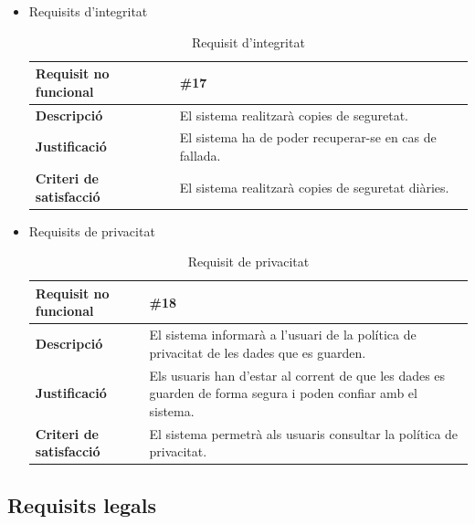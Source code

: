 \begin{itemize}
\item{Requisits d'integritat}
\begin{table}[!h]
\centering
\begin{tabular}{|l|M|}
\hline
\textbf{Requisit no funcional }& \#17  \\ \hline
\textbf{Descripció} &  El sistema realitzarà copies de seguretat.\\ \hline
\textbf{Justificació} &  El sistema ha de poder recuperar-se en cas de fallada. \\ \hline
\textbf{Criteri de satisfacció} &  El sistema realitzarà copies de seguretat diàries.\\ \hline
\end{tabular}
\label{}
\caption{Requisit d'integritat}
\end{table}


\item{Requisits de privacitat}
\begin{table}[!h]
\centering
\begin{tabular}{|l|M|}
\hline
\textbf{Requisit no funcional }& \#18  \\ \hline
\textbf{Descripció} & El sistema informarà a l’usuari de la política de privacitat de les dades que es guarden.\\ \hline
\textbf{Justificació} & Els usuaris han d’estar al corrent de que les dades es
guarden de forma segura i poden confiar amb el sistema. \\ \hline
\textbf{Criteri de satisfacció} & El sistema permetrà als usuaris consultar la política de privacitat.\\ \hline
\end{tabular}
\label{}
\caption{Requisit de privacitat}
\end{table}

\end{itemize}


\clearpage
\subsection{Requisits legals}

